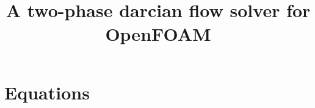 \documentclass[]{article}
\title{A two-phase darcian flow solver for OpenFOAM}
\author{}
\begin{document}
\maketitle

\begin{abstract}

\end{abstract}

\section{Equations}
\end{document}
